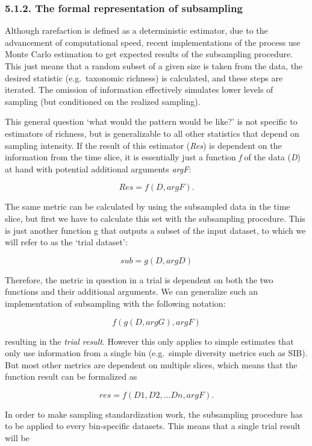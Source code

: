 \documentclass[]{article}
\begin{document}
\subsubsection{5.1.2. The formal representation of
subsampling}\label{the-formal-representation-of-subsampling}

Although rarefaction is defined as a deterministic estimator, due to the
advancement of computational speed, recent implementations of the
process use Monte Carlo estimation to get expected results of the
subsampling procedure. This just means that a random subset of a given
size is taken from the data, the desired statistic (e.g.~taxonomic
richness) is calculated, and these steps are iterated. The omission of
information effectively simulates lower levels of sampling (but
conditioned on the realized sampling).

This general question `what would the pattern would be like?' is not
specific to estimators of richness, but is generalizable to all other
statistics that depend on sampling intensity. If the result of this
estimator (\emph{Res}) is dependent on the information from the time
slice, it is essentially just a function \emph{f} of the data (\emph{D})
at hand with potential additional arguments \emph{argF}:

\[Res= f(D, argF).\]

The same metric can be calculated by using the subsampled data in the
time slice, but first we have to calculate this set with the subsampling
procedure. This is just another function g that outputs a subset of the
input dataset, to which we will refer to as the `trial dataset':

\[sub = g(D, argD)\]

Therefore, the metric in question in a trial is dependent on both the
two functions and their additional arguments. We can generalize such an
implementation of subsampling with the following notation:

\[f(g(D, argG), argF)\]

resulting in the \emph{trial result}. However this only applies to
simple estimates that only use information from a single bin
(e.g.~simple diversity metrics such as SIB). But most other metrics are
dependent on multiple slices, which means that the function result can
be formalized as

\[res = f(D1, D2,... Dn, argF).\]

In order to make sampling standardization work, the subsampling
procedure has to be applied to every bin-specific datasets. This means
that a single trial result will be
\end{document}
